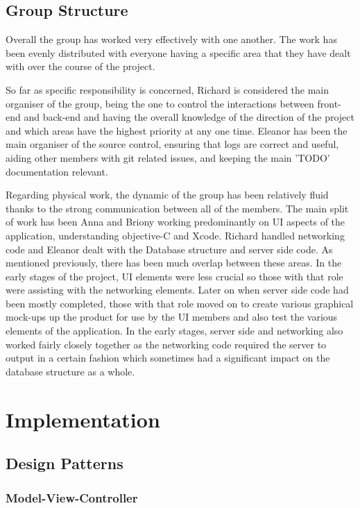 \documentclass[a4wide, 10pt]{article}
\begin{document}
\subsection{Group Structure}

Overall the group has worked very effectively with one another. The work has been evenly distributed with everyone having a specific area that they have dealt with over the course of the project. 

So far as specific responsibility is concerned, Richard is considered the main organiser of the group, being the one to control the interactions between front-end and back-end and having the overall knowledge of the direction of the project and which areas have the highest priority at any one time. Eleanor has been the main organiser of the source control, ensuring that logs are correct and useful, aiding other members with git related issues, and keeping the main 'TODO' documentation relevant.

Regarding physical work, the dynamic of the group has been relatively fluid thanks to the strong communication between all of the members. The main split of work has been Anna and Briony working predominantly on UI aspects of the application, understanding objective-C and Xcode. Richard handled networking code and Eleanor dealt with the Database structure and server side code. As mentioned previously, there has been much overlap between these areas. In the early stages of the project, UI elements were less crucial so those with that role were assisting with the networking elements. Later on when server side code had been mostly completed, those with that role moved on to create various graphical mock-ups up the product for use by the UI members and also test the various elements of the application. In the early stages, server side and networking also worked fairly closely together as the networking code required the server to output in a certain fashion which sometimes had a significant impact on the database structure as a whole. 

\section{Implementation}

\subsection{Design Patterns}

\subsubsection{Model-View-Controller}
\end{document}
